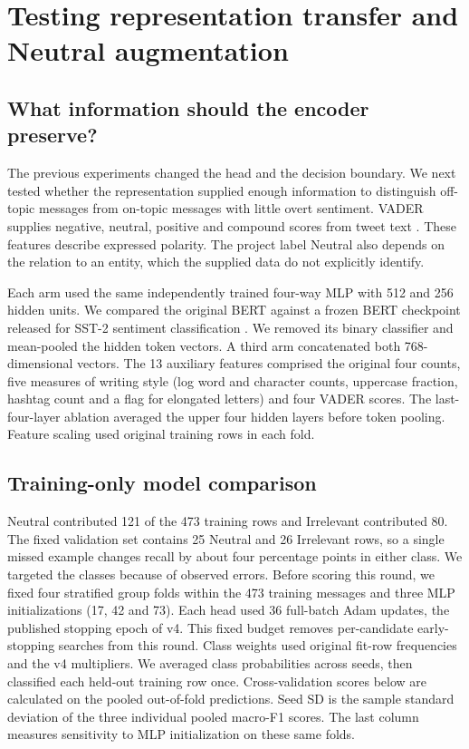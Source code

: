\section{Testing representation transfer and Neutral augmentation}

\subsection{What information should the encoder preserve?}

The previous experiments changed the head and the decision boundary. We next tested whether the representation supplied enough information to distinguish off-topic messages from on-topic messages with little overt sentiment. VADER supplies negative, neutral, positive and compound scores from tweet text \cite{vader}. These features describe expressed polarity. The project label Neutral also depends on the relation to an entity, which the supplied data do not explicitly identify.

Each arm used the same independently trained four-way MLP with 512 and 256 hidden units. We compared the original BERT against a frozen BERT checkpoint released for SST-2 sentiment classification \cite{sstbert}. We removed its binary classifier and mean-pooled the hidden token vectors. A third arm concatenated both 768-dimensional vectors. The 13 auxiliary features comprised the original four counts, five measures of writing style (log word and character counts, uppercase fraction, hashtag count and a flag for elongated letters) and four VADER scores. The last-four-layer ablation averaged the upper four hidden layers before token pooling. Feature scaling used original training rows in each fold.

\subsection{Training-only model comparison}

Neutral contributed 121 of the 473 training rows and Irrelevant contributed 80. The fixed validation set contains 25 Neutral and 26 Irrelevant rows, so a single missed example changes recall by about four percentage points in either class. We targeted the classes because of observed errors. Before scoring this round, we fixed four stratified group folds within the 473 training messages and three MLP initializations (17, 42 and 73). Each head used 36 full-batch Adam updates, the published stopping epoch of v4. This fixed budget removes per-candidate early-stopping searches from this round. Class weights used original fit-row frequencies and the v4 multipliers. We averaged class probabilities across seeds, then classified each held-out training row once. Cross-validation scores below are calculated on the pooled out-of-fold predictions. Seed SD is the sample standard deviation of the three individual pooled macro-F1 scores. The last column measures sensitivity to MLP initialization on these same folds.


